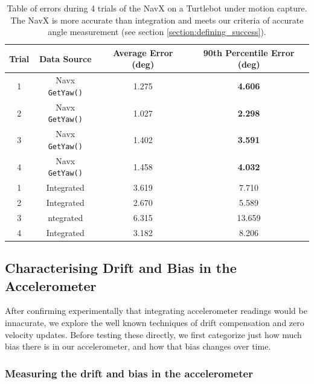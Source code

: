 \documentclass{article}
\begin{document}
    \begin{table}[H]
      \centering
      \begin{tabular}{|c|c|c|c|} \hline
        Trial & Data Source & Average Error (deg) & 90th Percentile Error (deg) \\ \hline
        1 & Navx \texttt{GetYaw()} & 1.275 & \textbf{4.606} \\ \hline
        2 & Navx \texttt{GetYaw()} & 1.027 & \textbf{2.298} \\ \hline
        3 & Navx \texttt{GetYaw()} & 1.402 & \textbf{3.591} \\ \hline
        4 & Navx \texttt{GetYaw()} & 1.458 & \textbf{4.032} \\ \hline
        1 & Integrated & 3.619 & 7.710 \\ \hline
        2 & Integrated & 2.670 & 5.589 \\ \hline
        3 & ntegrated & 6.315 & 13.659 \\ \hline
        4 & Integrated & 3.182 & 8.206 \\ \hline
      \end{tabular}
      \caption{Table of errors during 4 trials of the NavX on a Turtlebot under motion capture. The NavX is more accurate than integration and meets our criteria of accurate angle measurement (see section \ref{section:defining_success}).}
      \label{}
    \end{table}

  \subsection{Characterising Drift and Bias in the Accelerometer}

    After confirming experimentally that integrating accelerometer readings would be innacurate, we explore the well known techniques of drift compensation and zero velocity updates. Before testing these directly, we first categorize just how much bias there is in our accelerometer, and how that bias changes over time.

    \subsubsection{Measuring the drift and bias in the accelerometer} \label{section:drift_bias}
\end{document}
